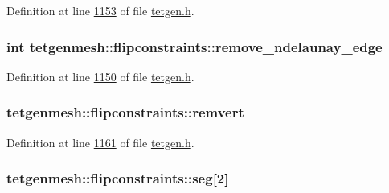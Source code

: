 Definition at line \hyperlink{tetgen_8h_source_l01153}{1153} of file \hyperlink{tetgen_8h_source}{tetgen.\+h}.

\subsubsection[{\texorpdfstring{remove\+\_\+ndelaunay\+\_\+edge}{remove_ndelaunay_edge}}]{\setlength{\rightskip}{0pt plus 5cm}int tetgenmesh\+::flipconstraints\+::remove\+\_\+ndelaunay\+\_\+edge}\hypertarget{classtetgenmesh_1_1flipconstraints_ab0ac97086329360ad119f215bd4fe02b}{}\label{classtetgenmesh_1_1flipconstraints_ab0ac97086329360ad119f215bd4fe02b}


Definition at line \hyperlink{tetgen_8h_source_l01150}{1150} of file \hyperlink{tetgen_8h_source}{tetgen.\+h}.

\subsubsection[{\texorpdfstring{remvert}{remvert}}]{ tetgenmesh\+::flipconstraints\+::remvert}\hypertarget{classtetgenmesh_1_1flipconstraints_a1a6025cc57533d98fef46ffbdcbbc83f}{}\label{classtetgenmesh_1_1flipconstraints_a1a6025cc57533d98fef46ffbdcbbc83f}


Definition at line \hyperlink{tetgen_8h_source_l01161}{1161} of file \hyperlink{tetgen_8h_source}{tetgen.\+h}.

\subsubsection[{\texorpdfstring{seg}{seg}}]{ tetgenmesh\+::flipconstraints\+::seg\mbox{[}2\mbox{]}}\hypertarget{classtetgenmesh_1_1flipconstraints_a65862c9f061693a1961f96f3f471c95e}{}\label{classtetgenmesh_1_1flipconstraints_a65862c9f061693a1961f96f3f471c95e}


